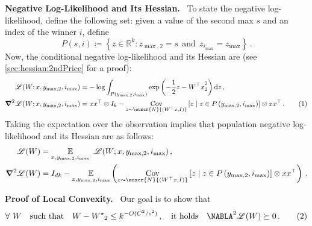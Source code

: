 \documentclass[11pt,letterpaper]{article}
\theoremstyle{plain}
\theoremstyle{definition}
\theoremstyle{remark}
\newcommand{\yesnum}{\addtocounter{equation}{1}\tag{\theequation}}
\newcommand{\quadtext}[1]{\quad\text{#1}\quad}
\newcommand{\inbrace}[1]{\ensuremath{\left\{#1\right\}}}
\newcommand{\inparen}[1]{\ensuremath{\left(#1\right)}}
\newcommand{\insquare}[1]{\ensuremath{\left[#1\right]}}
\let\norm\relax
\newcommand{\norm}[1]{\ensuremath{\left\lVert #1 \right\rVert}}
\newcommand{\R}{\mathbb{R}}
\newcommand{\E}{\operatornamewithlimits{\mathbb{E}}}
\newcommand{\Ex}{\E}
\newcommand{\cov}{\ensuremath{\operatornamewithlimits{\rm Cov}}}
\newcommand{\sfrac}[2]{{#1/#2}}
\newcommand*{\Nabla}{\boldsymbol\NABLA}
\let\nabla\Nabla
\newcommand{\customcal}[1]{\euscr{#1}}
\newcommand{\cL}{\customcal{L}}
\newcommand{\cN}{\customcal{N}}
\renewcommand{\paragraph}[1]{\medskip \noindent\textbf{#1}~}
\newcommand{\negLL}{\ensuremath{\mathscr{L}}}
\renewcommand{\d}{{\rm d}}
\newcommand{\normal}[2]{\cN{\inparen{#1,#2}}}
\newcommand{\Wstar}{{W^\star}}
\renewcommand{\cL}{\negLL}
\newcommand{\smax}{\max,2} %
\newcommand{\imax}{i_{\max}}
\newcommand{\ysmax}{y_{\smax}}
\begin{document}
{{    \paragraph{Negative Log-Likelihood and Its Hessian.}
        To state the negative log-likelihood, define the following set: given a value of the second max $s$ and an index of the winner $i$, define 
        \[
            P(s,i)\coloneqq 
            \inbrace{
                z\in \R^k\colon 
                    z_{\smax} = s ~~\text{and}~~ z_{\imax} = z_{\max}
            }\,.
        \]
        Now, the conditional negative log-likelihood and its Hessian are (see \cref{sec:hessian:2ndPrice} for a proof):
        \begin{align*}
            \cL(W; x, \ysmax, \imax) &= -\log{
                \int_{P(\ysmax, \imax)} \exp\inparen{-\frac{1}{2}\norm{z-W^\top x}_2^2}\d z 
            }\,,\\
            \grad^2 \cL(W; x, \ysmax, \imax) &= 
            xx^\top \otimes I_{k} - {
                \cov_{z\sim \normal{W^\top x}{I}}\insquare{z\mid z\in P\inparen{\ysmax,\imax}}
                \otimes xx^\top
            } 
            \,.
            \yesnum\label{eq:2ndPrice:conditionalHe2ndPrice:mainBody}
        \end{align*}
        Taking the expectation over the observation implies that population negative log-likelihood and its Hessian are as follows:
        \begin{align*}
            \cL(W) &= \Ex_{x,\ysmax,\imax}~\cL(W; x, \ysmax, \imax)\,,\\
            \grad^2 \cL(W) &= I_{dk} - \Ex_{x,\ysmax,\imax}\inparen{
                \cov_{z\sim \normal{W^\top x}{I}}\insquare{z\mid z\in P\inparen{\ysmax,\imax}}
                \otimes xx^\top
            }\,.
        \end{align*}

    \paragraph{Proof of Local Convexity.}
        Our goal is to show that 
        \[
            \forall~W\quadtext{such that}
            \norm{W-\Wstar}_2 \leq k^{-O(\sfrac{C^2}{c^2})}\,,
            \quadtext{it holds} \nabla^2 \cL(W) \succeq 0 \,.
            \yesnum\label{eq:2ndPrice:LC:sufficientCondition}
        \] 
    
}}
\end{document}

